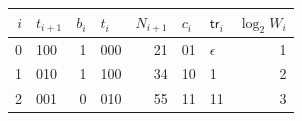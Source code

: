 \begin{tabular}{r l r l r l l r}%
\hline%
\textbf{$i$}&\textbf{$t_{i+1}$}&\textbf{$b_i$}&\textbf{$t_i$}&\textbf{$N_{i+1}$}&\textbf{$c_i$}&\textbf{$\mathsf{tr}_i$}&\textbf{$\log_2 W_i$}\\%
\hline%
0&100&1&000&21&01&\(\epsilon\)&1\\%
1&010&1&100&34&10&1&2\\%
2&001&0&010&55&11&11&3\\%
\hline%
\end{tabular}
